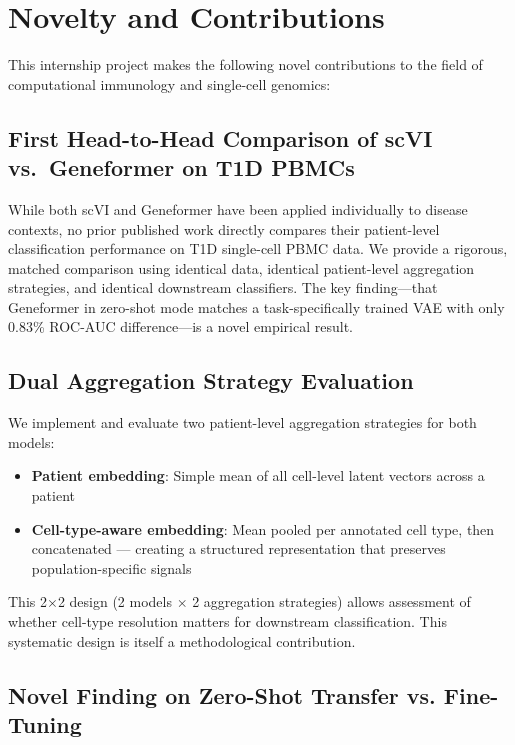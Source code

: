 \chapter{Novelty and Contributions}
\label{chap:novelty}

This internship project makes the following novel contributions to the field of computational immunology and single-cell genomics:

\section{First Head-to-Head Comparison of scVI vs.\ Geneformer on T1D PBMCs}

While both scVI and Geneformer have been applied individually to disease contexts, no prior published work directly compares their patient-level classification performance on T1D single-cell PBMC data. We provide a rigorous, matched comparison using identical data, identical patient-level aggregation strategies, and identical downstream classifiers. The key finding---that Geneformer in zero-shot mode matches a task-specifically trained VAE with only 0.83\% ROC-AUC difference---is a novel empirical result.

\section{Dual Aggregation Strategy Evaluation}

We implement and evaluate two patient-level aggregation strategies for both models:
\begin{itemize}
    \item \textbf{Patient embedding}: Simple mean of all cell-level latent vectors across a patient
    \item \textbf{Cell-type-aware embedding}: Mean pooled per annotated cell type, then concatenated --- creating a structured representation that preserves population-specific signals
\end{itemize}

This 2$\times$2 design (2 models $\times$ 2 aggregation strategies) allows assessment of whether cell-type resolution matters for downstream classification. This systematic design is itself a methodological contribution.

\section{Novel Finding on Zero-Shot Transfer vs. Fine-Tuning}

